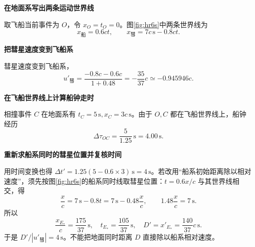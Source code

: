 \begin{solution}\textbf{在地面系写出两条运动世界线}\par\nobreak
取飞船当前事件为 $O$，令 $x_O=t_O=0$。图\ref{fig:hr6s}中两条世界线为
\[
x_{\text{船}}=0.6ct,\qquad x_{\text{彗}}=7c\,\mathrm s-0.8ct.
\]


\par\medskip{}\noindent\textbf{把彗星速度变到飞船系}\par\nobreak
彗星速度变到飞船系，
\[
\boxed{u'_{\text{彗}}=\frac{-0.8c-0.6c}{1+0.48}
=-\frac{35}{37}c\simeq-0.945946c.}
\]


\par\medskip{}\noindent\textbf{在飞船世界线上计算船钟走时}\par\nobreak
相撞事件 $C$ 在地面系有 $t_C=5\,\mathrm s,x_C=3c\,\mathrm s$。由于 $O,C$ 都在飞船世界线上，船钟经历
\[
\boxed{\Delta\tau_{OC}=\frac5{1.25}\,\mathrm s=4.00\,\mathrm s.}
\]



\par\medskip{}\noindent\textbf{重新求船系同时的彗星位置并复核时间}\par\nobreak
用时间变换也得 $\Delta t'=1.25(5-0.6\times3)\,\mathrm s=4\,\mathrm s$。若改用“船系初始距离除以相对速度”，须先按图\ref{fig:hr6s}的船系同时线取彗星位置：$t=0.6x/c$ 与其世界线相交，得
\[
\frac{x}{c}=7\,\mathrm s-0.8t
=7\,\mathrm s-0.48\frac{x}{c},\qquad
1.48\frac{x}{c}=7\,\mathrm s.
\]
所以
\[
\frac{x_{E_*}}c=\frac{175}{37}\,\mathrm s,\quad
t_{E_*}=\frac{105}{37}\,\mathrm s,\quad
D'=x'_{E_*}=\frac{140}{37}c\,\mathrm s.
\]
于是 $D'/|u'_{\text{彗}}|=4\,\mathrm s$。不能把地面同时距离 $D$ 直接除以船系相对速度。
\end{solution}


